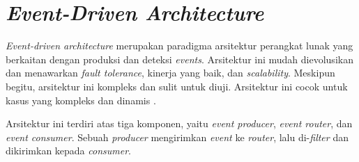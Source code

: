 \section{\textit{Event-Driven Architecture}}

\textit{Event-driven architecture} merupakan paradigma arsitektur perangkat lunak yang berkaitan dengan produksi dan deteksi \textit{events}. Arsitektur ini mudah dievolusikan dan menawarkan \textit{fault tolerance}, kinerja yang baik, dan \textit{scalability}. Meskipun begitu, arsitektur ini kompleks dan sulit untuk diuji. Arsitektur ini cocok untuk kasus yang kompleks dan dinamis \parencite{softwareArchitecture}.

Arsitektur ini terdiri atas tiga komponen, yaitu \textit{event producer}, \textit{event router}, dan \textit{event consumer}. Sebuah \textit{producer} mengirimkan \textit{event} ke \textit{router}, lalu di-\textit{filter} dan dikirimkan kepada \textit{consumer}.





